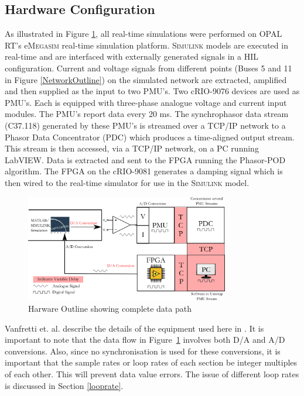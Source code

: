 \documentclass[journal]{IEEEtran}
\begin{document}
\subsection{Hardware Configuration}
As illustrated in Figure \ref {Hardware_Outline}, all real-time simulations were performed on OPAL RT's e\textsc{Megasim} \cite{OPALemegasim} real-time simulation platform. \textsc{Simulink} models are executed in real-time and are interfaced with externally generated signals in a HIL configuration. Current and voltage signals from different points (Buses 5 and 11 in Figure \ref{NetworkOutline}) on the simulated network are extracted, amplified and then supplied as the input to two PMU's. Two cRIO-9076 \cite{cRIO9076} devices are used as PMU's. Each is equipped with three-phase analogue voltage and current input modules. The PMU\rq{s} report data every 20 ms. The synchrophasor data stream (C37.118) generated by these PMU\rq{s} is streamed over a TCP/IP network to a Phasor Data Concentrator (PDC) which produces a time-aligned output stream. This stream is then accessed, via a TCP/IP network, on a PC running LabVIEW. Data is extracted and sent to the FPGA running the Phasor-POD algorithm. The FPGA on the cRIO-9081 \cite{cRIO9081} generates a damping signal which is then wired to the real-time simulator for use in the \textsc{Simulink} model.

\begin{figure}[!h]
\centering
\includegraphics[width=3.5in]{DataFlow.png} 
\caption{Harware Outline showing complete data path}
\label{Hardware_Outline}
\end{figure}

Vanfretti et. al. describe the details of the equipment used here in \cite{PhasorPODImplement}. It is important to note that the data flow in Figure~\ref{Hardware_Outline} involves both D/A and A/D conversions. Also, since no synchronisation is used for these conversions, it is important that the sample rates or loop rates of each section be integer multiples of each other. This will prevent data value errors. The issue of different loop rates is discussed in Section \ref{looprate}.
\end{document}
